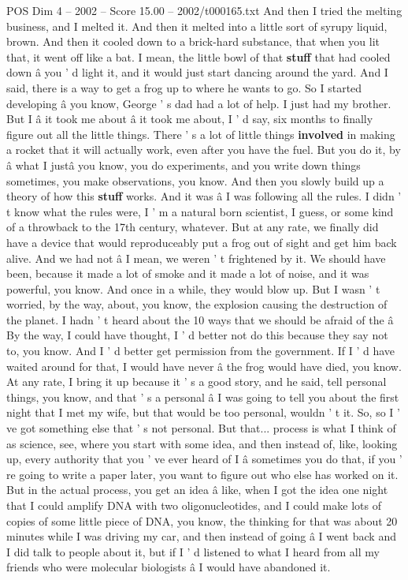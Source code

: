 \begin{textsample}{POS Dim 4 – 2002 – Score 15.00 – 2002/t000165.txt}
And then I tried the melting business, and I melted it.
And then it melted into a little sort of syrupy liquid, brown.
And then it cooled down to a brick-hard substance, that when you lit that, it went off like a bat.
I mean, the little bowl of that \textbf{stuff} that had cooled down â you ' d light it, and it would just start dancing around the yard.
And I said, there is a way to get a frog up to where he wants to go.
So I started developing â you know, George ' s dad had a lot of help.
I just had my brother.
But I â it took me about â it took me about, I ' d say, six months to finally figure out all the little things.
There ' s a lot of little things \textbf{involved} in making a rocket that it will actually work, even after you have the fuel.
But you do it, by â what I justâ you know, you do experiments, and you write down things sometimes, you make observations, you know.
And then you slowly build up a theory of how this \textbf{stuff} works.
And it was â I was following all the rules.
I didn ' t know what the rules were, I ' m a natural born scientist, I guess, or some kind of a throwback to the 17th century, whatever.
But at any rate, we finally did have a device that would reproduceably put a frog out of sight and get him back alive.
And we had not â I mean, we weren ' t frightened by it.
We should have been, because it made a lot of smoke and it made a lot of noise, and it was powerful, you know.
And once in a while, they would blow up.
But I wasn ' t worried, by the way, about, you know, the explosion causing the destruction of the planet.
I hadn ' t heard about the 10 ways that we should be afraid of the â By the way, I could have thought, I ' d better not do this because they say not to, you know.
And I ' d better get permission from the government.
If I ' d have waited around for that, I would have never â the frog would have died, you know.
At any rate, I bring it up because it ' s a good story, and he said, tell personal things, you know, and that ' s a personal â I was going to tell you about the first night that I met my wife, but that would be too personal, wouldn ' t it.
So, so I ' ve got something else that ' s not personal.
But that... process is what I think of as science, see, where you start with some idea, and then instead of, like, looking up, every authority that you ' ve ever heard of I â sometimes you do that, if you ' re going to write a paper later, you want to figure out who else has worked on it.
But in the actual process, you get an idea â like, when I got the idea one night that I could amplify DNA with two oligonucleotides, and I could make lots of copies of some little piece of DNA, you know, the thinking for that was about 20 minutes while I was driving my car, and then instead of going â I went back and I did talk to people about it, but if I ' d listened to what I heard from all my friends who were molecular biologists â I would have abandoned it.

\end{textsample}
